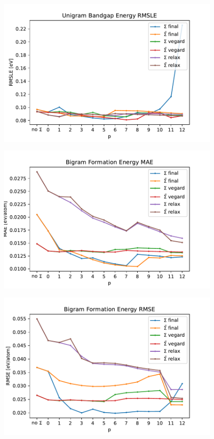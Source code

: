 \documentclass[11pt,oneside,czech,american]{book} %
\theoremstyle{definition} %
\theoremstyle{definition}
\begin{document}
\begin{figure}[H]
	\centering
	\includegraphics[scale=0.6]{unigram_RMSLE_gap.pdf}
	\caption{}
	\label{}
\end{figure}
\begin{figure}[H]
	\centering
	\includegraphics[scale=0.6]{bigram_MAE_form.pdf}
	\caption{}
	\label{}
\end{figure}
\begin{figure}[H]
	\centering
	\includegraphics[scale=0.6]{bigram_RMSE_form.pdf}
	\caption{}
	\label{}
\end{figure}
\end{document}
